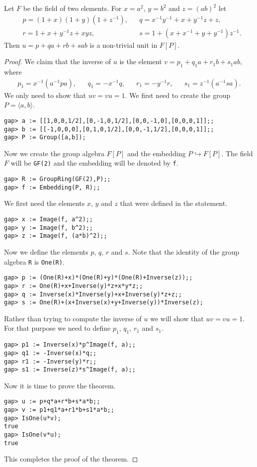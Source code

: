 \begin{theorem}[Gardam]
    Let $F$ be the field of two elements. For
    $x=a^2$, $y=b^2$ and $z=(ab)^2$ let
    \begin{align*}
        &p=(1+x)(1+y)(1+z^{-1}),
        &&q = x^{-1}y^{-1}+x+y^{-1}z+z,\\
        &r = 1+x+y^{-1}z+xyz,
        &&s=1+(x+x^{-1}+y+y^{-1})z^{-1}.
    \end{align*}
    Then $u=p+qa+rb+sab$ is a non-trivial unit in $F[P]$.
\end{theorem}

\begin{proof}
    We claim that the inverse of $u$
    is the element $v=p_1+q_1a+r_1b+s_1ab$, where
    \begin{align*}
        p_1=x^{-1}(a^{-1}pa),
        && q_1=-x^{-1}q,
        && r_1=-y^{-1}r,
        && s_1=z^{-1}(a^{-1}sa).
    \end{align*}
    We only need to show that $uv=vu=1$. 
    We first need to create the group $P=\langle a,b\rangle$.
\begin{lstlisting}
gap> a := [[1,0,0,1/2],[0,-1,0,1/2],[0,0,-1,0],[0,0,0,1]];;
gap> b := [[-1,0,0,0],[0,1,0,1/2],[0,0,-1,1/2],[0,0,0,1]];;
gap> P := Group([a,b]);
\end{lstlisting}
    Now we create the group algebra $F[P]$ and
    the embedding $P\hookrightarrow F[P]$.
    The field $F$ will be \lstinline{GF(2)}
    and the embedding will be denoted by \lstinline{f}.
\begin{lstlisting}
gap> R := GroupRing(GF(2),P);;
gap> f := Embedding(P, R);;
\end{lstlisting}
    We first need the elements $x$, $y$ and $z$ that were defined in the
    statement.
\begin{lstlisting}
gap> x := Image(f, a^2);;
gap> y := Image(f, b^2);;
gap> z := Image(f, (a*b)^2);;
\end{lstlisting}
    Now we define the elements $p$, $q$, $r$ and $s$. Note that
    the identity of the group algebra \lstinline{R}
    is \lstinline{One(R)}.
\begin{lstlisting}
gap> p := (One(R)+x)*(One(R)+y)*(One(R)+Inverse(z));;
gap> r := One(R)+x+Inverse(y)*z+x*y*z;;
gap> q := Inverse(x)*Inverse(y)+x+Inverse(y)*z+z;;
gap> s := One(R)+(x+Inverse(x)+y+Inverse(y))*Inverse(z);
\end{lstlisting}
    Rather than trying
    to compute the inverse of $u$ we will show that
    $uv=vu=1$. For that purpose we need to define
    $p_1$, $q_1$, $r_1$ and $s_1$.
\begin{lstlisting}
gap> p1 := Inverse(x)*p^Image(f, a);;
gap> q1 := -Inverse(x)*q;;
gap> r1 := -Inverse(y)*r;;
gap> s1 := Inverse(z)*s^Image(f, a);;
\end{lstlisting}
Now it is time to prove the theorem.
\begin{lstlisting}
gap> u := p+q*a+r*b+s*a*b;;
gap> v := p1+q1*a+r1*b+s1*a*b;;
gap> IsOne(u*v);
true
gap> IsOne(v*u);
true
\end{lstlisting}
This completes the proof of the theorem.
\end{proof}


